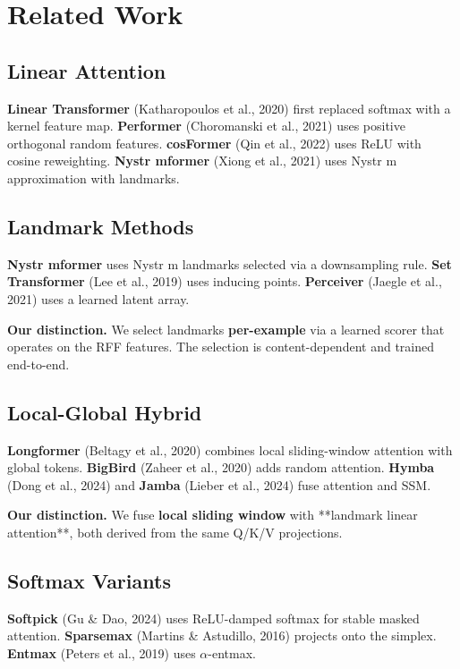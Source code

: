 \section{Related Work}

\subsection{Linear Attention}

\textbf{Linear Transformer} (Katharopoulos et al., 2020) first replaced softmax 
with a kernel feature map. \textbf{Performer} (Choromanski et al., 2021) uses 
positive orthogonal random features. \textbf{cosFormer} (Qin et al., 2022) uses 
ReLU with cosine reweighting. \textbf{Nystr mformer} (Xiong et al., 2021) uses 
Nystr m approximation with landmarks.

\subsection{Landmark Methods}

\textbf{Nystr mformer} uses Nystr m landmarks selected via a downsampling rule. 
\textbf{Set Transformer} (Lee et al., 2019) uses inducing points. \textbf{Perceiver} 
(Jaegle et al., 2021) uses a learned latent array.

\textbf{Our distinction.} We select landmarks \textbf{per-example} via a learned 
scorer that operates on the RFF features. The selection is content-dependent 
and trained end-to-end.

\subsection{Local-Global Hybrid}

\textbf{Longformer} (Beltagy et al., 2020) combines local sliding-window 
attention with global tokens. \textbf{BigBird} (Zaheer et al., 2020) adds 
random attention. \textbf{Hymba} (Dong et al., 2024) and \textbf{Jamba} (Lieber 
et al., 2024) fuse attention and SSM.

\textbf{Our distinction.} We fuse \textbf{local sliding window} with **landmark 
linear attention**, both derived from the same Q/K/V projections.

\subsection{Softmax Variants}

\textbf{Softpick} (Gu \& Dao, 2024) uses ReLU-damped softmax for stable 
masked attention. \textbf{Sparsemax} (Martins \& Astudillo, 2016) projects 
onto the simplex. \textbf{Entmax} (Peters et al., 2019) uses $\alpha$-entmax.

